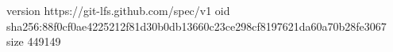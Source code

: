 version https://git-lfs.github.com/spec/v1
oid sha256:88f0cf0ae4225212f81d30b0db13660c23ce298cf8197621da60a70b28fe3067
size 449149
